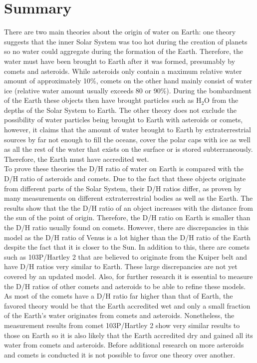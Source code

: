 
\section*{Summary}

There are two main theories about the origin of water on Earth: one theory suggests that the inner Solar System was too hot during the creation of planets so no water could aggregate during the formation of the Earth. Therefore, the water must have been brought to Earth after it was formed, presumably by comets and asteroids. While asteroids only contain a maximum relative water amount of approximately 10\%, comets on the other hand mainly consist of water ice (relative water amount usually exceeds 80 or 90\%). During the bombardment of the Earth these objects then have brought particles such as H$_2$O from the depths of the Solar System to Earth. 
The other theory does not exclude the possibility of water particles being brought to Earth with asteroids or comets, however, it claims that the amount of water brought to Earth by extraterrestrial sources by far not enough to fill the oceans, cover the polar caps with ice as well as all the rest of the water that exists on the surface or is stored subterraneously. Therefore, the Earth must have accredited wet.\\

To prove these theories the D/H ratio of water on Earth is compared with the D/H ratio of asteroids and comets. Due to the fact that these objects originate from different parts of the Solar System, their D/H ratios differ, as proven by many measurements on different extraterrestrial bodies as well as the Earth. The results show that the the D/H ratio of an object increases with the distance from the sun of the point of origin. Therefore, the D/H ratio on Earth is smaller than the D/H ratio usually found on comets. However, there are discrepancies in this model as the D/H ratio of Venus is a lot higher than the D/H ratio of the Earth despite the fact that it is closer to the Sun. In addition to this, there are comets such as 103P/Hartley 2 that are believed to originate from the Kuiper belt and have D/H ratios very similar to Earth. These large discrepancies are not yet covered by an updated model. Also, for further research it is essential to measure the D/H ratios of other comets and asteroids to be able to refine these models.\\

As most of the comets have a D/H ratio far higher than that of Earth, the favored theory would be that the Earth accredited wet and only a small fraction of the Earth's water originates from comets and asteroids. Nonetheless, the measurement results from comet 103P/Hartley 2 show very similar results to those on Earth so it is also likely that the Earth accredited dry and gained all its water from comets and asteroids. Before additional research on more asteroids and comets is conducted it is not possible to favor one theory over another.



